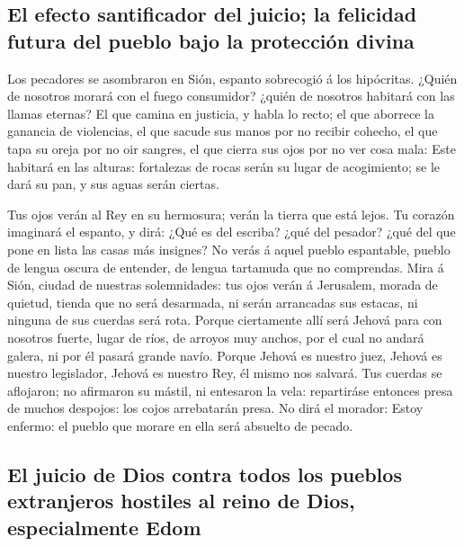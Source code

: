 \hypertarget{el-efecto-santificador-del-juicio-la-felicidad-futura-del-pueblo-bajo-la-protecciuxf3n-divina}{%
\subsection{El efecto santificador del juicio; la felicidad futura del
pueblo bajo la protección
divina}\label{el-efecto-santificador-del-juicio-la-felicidad-futura-del-pueblo-bajo-la-protecciuxf3n-divina}}

 Los pecadores se asombraron en Sión, espanto sobrecogió
á los hipócritas. ¿Quién de nosotros morará con el fuego consumidor?
¿quién de nosotros habitará con las llamas eternas?  El
que camina en justicia, y habla lo recto; el que aborrece la ganancia de
violencias, el que sacude sus manos por no recibir cohecho, el que tapa
su oreja por no oir sangres, el que cierra sus ojos por no ver cosa
mala:  Este habitará en las alturas: fortalezas de rocas
serán su lugar de acogimiento; se le dará su pan, y sus aguas serán
ciertas.

 Tus ojos verán al Rey en su hermosura; verán la tierra
que está lejos.  Tu corazón imaginará el espanto, y dirá:
¿Qué es del escriba? ¿qué del pesador? ¿qué del que pone en lista las
casas más insignes?  No verás á aquel pueblo espantable,
pueblo de lengua oscura de entender, de lengua tartamuda que no
comprendas.  Mira á Sión, ciudad de nuestras
solemnidades: tus ojos verán á Jerusalem, morada de quietud, tienda que
no será desarmada, ni serán arrancadas sus estacas, ni ninguna de sus
cuerdas será rota.  Porque ciertamente allí será Jehová
para con nosotros fuerte, lugar de ríos, de arroyos muy anchos, por el
cual no andará galera, ni por él pasará grande navío. 
Porque Jehová es nuestro juez, Jehová es nuestro legislador, Jehová es
nuestro Rey, él mismo nos salvará.  Tus cuerdas se
aflojaron; no afirmaron su mástil, ni entesaron la vela: repartiráse
entonces presa de muchos despojos: los cojos arrebatarán presa.
 No dirá el morador: Estoy enfermo: el pueblo que morare
en ella será absuelto de pecado.

\hypertarget{el-juicio-de-dios-contra-todos-los-pueblos-extranjeros-hostiles-al-reino-de-dios-especialmente-edom}{%
\subsection{El juicio de Dios contra todos los pueblos extranjeros
hostiles al reino de Dios, especialmente
Edom}\label{el-juicio-de-dios-contra-todos-los-pueblos-extranjeros-hostiles-al-reino-de-dios-especialmente-edom}}

